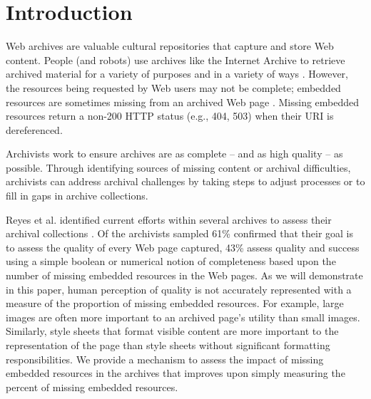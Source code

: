 \section{Introduction}
\label{introduction}
Web archives are valuable cultural repositories that capture and store Web content. People (and robots) use archives like the Internet Archive \cite{iawebarchive, waybackarchives2} to retrieve archived material \cite{usingIA, marshalls_social_media_study} for a variety of purposes and in a variety of ways \cite{yasminLinks}. However, the resources being requested by Web users may not be complete; embedded resources are sometimes missing from an archived Web page \cite{ipresArchivability}. Missing embedded resources return a non-200 HTTP status (e.g., 404, 503) when their URI is dereferenced.

Archivists work to ensure archives are as complete -- and as high quality -- as possible. Through identifying sources of missing content or archival difficulties, archivists can address archival challenges by taking steps to adjust processes or to fill in gaps in archive collections.

Reyes et al. identified current efforts within several archives to assess their archival collections \cite{archiveQA}. Of the archivists sampled 61\% confirmed that their goal is to assess the quality of every Web page captured, 43\% assess quality and success using a simple  boolean or numerical notion of completeness based upon the number of missing embedded resources in the Web pages. As we will demonstrate in this paper, human perception of quality is not accurately represented with a measure of the proportion of missing embedded resources. For example, large images are often more important to an archived page's utility than small images. Similarly, style sheets that format visible content are more important to the representation of the page than style sheets without significant formatting responsibilities. We provide a mechanism to assess the impact of missing embedded resources in the archives that improves upon simply measuring the percent of missing embedded resources.

